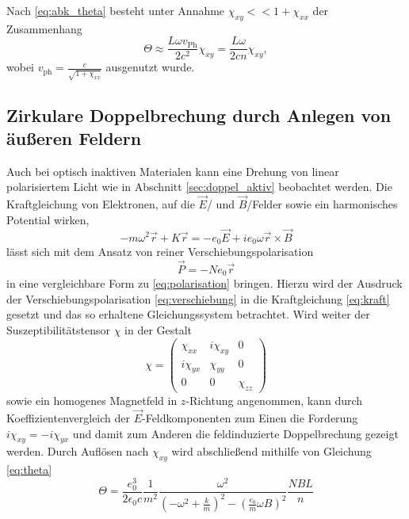 Nach \eqref{eq:abk_theta} besteht unter Annahme $\chi_{xy} << 1 + \chi_{xx}$ der Zusammenhang
\begin{equation}
    \Theta \approx \frac{L\omega v_\text{Ph}}{2c^2}\chi_{xy} = \frac{L\omega}{2cn}\chi_{xy},
    \label{eq:theta}
\end{equation}
wobei $v_\text{ph} = \frac{c}{\sqrt{1+\chi_{xx}}}$ ausgenutzt wurde.
\subsection{Zirkulare Doppelbrechung durch Anlegen von äußeren Feldern}
Auch bei optisch inaktiven Materialen kann eine Drehung von linear polarisiertem Licht wie in Abschnitt \ref{sec:doppel_aktiv} beobachtet werden.
Die Kraftgleichung von Elektronen, auf die $\vec E$\-/ und $\vec B$\-/Felder sowie ein harmonisches Potential wirken,
\begin{equation}
    -m\omega^2\vec r + K \vec r = -e_0 \vec E + i e_0 \omega \vec r \times \vec B
    \label{eq:kraft}
\end{equation}
lässt sich mit dem Ansatz von reiner Verschiebungspolarisation
\begin{equation}
    \vec P = - N e_0 \vec r
    \label{eq:verschiebung}
\end{equation}
in eine vergleichbare Form zu \eqref{eq:polarisation} bringen.
Hierzu wird der Ausdruck der Verschiebungspolarisation \eqref{eq:verschiebung} in die Kraftgleichung \eqref{eq:kraft} gesetzt und das so erhaltene Gleichungssystem betrachtet.
Wird weiter der Suszeptibilitätstensor $\chi$ in der Gestalt
\begin{equation}
    \chi = \begin{pmatrix} \chi_{xx} & i\chi_{xy} & 0 \\ i\chi_{yx} & \chi_{yy} & 0\\ 0 & 0 & \chi_{zz} \end{pmatrix}
\end{equation}
sowie ein homogenes Magnetfeld in $z$-Richtung angenommen, kann durch Koeffizientenvergleich der $\vec E$-Feldkomponenten zum Einen die Forderung $i\chi_{xy}=-i\chi_{yx}$ und damit zum Anderen die feldinduzierte Doppelbrechung gezeigt werden.
Durch Auflösen nach $\chi_{xy}$ wird abschließend mithilfe von Gleichung \eqref{eq:theta}
\begin{equation}
    \Theta = \frac{e_0^3}{2\epsilon_0 c}\frac{1}{m^2} \frac{\omega^2}{(-\omega^2+\frac{k}{m})^2-(\frac{e_0}{m}\omega B)^2} \frac{NBL}{n}
    \label{theta_1}
\end{equation}
